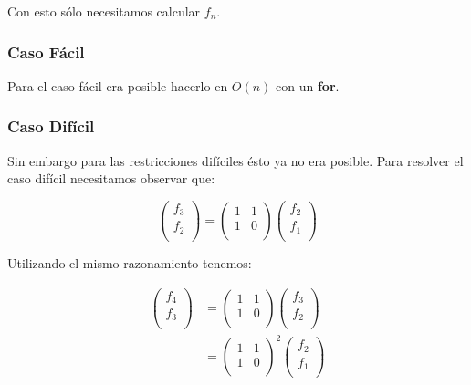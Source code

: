 Con esto sólo necesitamos calcular $f_n$. 
\subsubsection*{Caso Fácil}
Para el caso fácil era posible hacerlo en $O(n)$ con un \textbf{for}. 

\subsubsection*{Caso Difícil}
Sin embargo para las restricciones difíciles ésto ya no era posible. Para resolver el caso difícil necesitamos observar que:

$$
 \begin{pmatrix}
  f_3 \\
  f_2 \\
 \end{pmatrix}
 =
 \begin{pmatrix}
  1 & 1 \\
  1 & 0 \\
 \end{pmatrix}
 \begin{pmatrix}
  f_2 \\
  f_1 \\
 \end{pmatrix}
$$

Utilizando el mismo razonamiento tenemos:

 \begin{align*}
 \begin{pmatrix}
  f_4 \\
  f_3 \\
 \end{pmatrix} 
 & =
 \begin{pmatrix}
  1 & 1 \\
  1 & 0 \\
 \end{pmatrix}
 \begin{pmatrix}
  f_3 \\
  f_2 \\
 \end{pmatrix} \\
 & =
 \begin{pmatrix}
  1 & 1 \\
  1 & 0 \\
 \end{pmatrix}^2
 \begin{pmatrix}
  f_2 \\
  f_1 \\
 \end{pmatrix} 
\end{align*}

